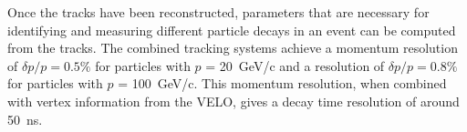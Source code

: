 Once the tracks have been reconstructed, parameters that are necessary for identifying and measuring different particle decays in an event can be computed from the tracks. The combined tracking systems achieve a momentum resolution of $\delta p / p = 0.5\%$ for particles with $p$ =  20~GeV/c and a resolution of $\delta p / p = 0.8\%$ for particles with $p$ =  100~GeV/c.  This momentum resolution, when combined with vertex information from the VELO, gives a decay time resolution of around 50~ns. 












